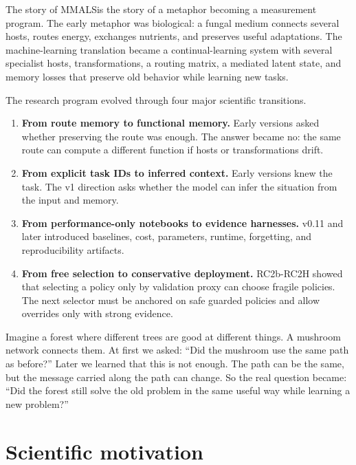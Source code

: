 \documentclass[11pt]{article}
\newcommand{\mmals}{\textsc{MMALS}}
\begin{document}
The story of \mmals is the story of a metaphor becoming a measurement program. The early metaphor was biological: a fungal medium connects several hosts, routes energy, exchanges nutrients, and preserves useful adaptations. The machine-learning translation became a continual-learning system with several specialist hosts, transformations, a routing matrix, a mediated latent state, and memory losses that preserve old behavior while learning new tasks.

The research program evolved through four major scientific transitions.

\begin{enumerate}[label=\textbf{T\arabic*.},leftmargin=*]
  \item \textbf{From route memory to functional memory.} Early versions asked whether preserving the route was enough. The answer became no: the same route can compute a different function if hosts or transformations drift.
  \item \textbf{From explicit task IDs to inferred context.} Early versions knew the task. The v1 direction asks whether the model can infer the situation from the input and memory.
  \item \textbf{From performance-only notebooks to evidence harnesses.} v0.11 and later introduced baselines, cost, parameters, runtime, forgetting, and reproducibility artifacts.
  \item \textbf{From free selection to conservative deployment.} RC2b-RC2H showed that selecting a policy only by validation proxy can choose fragile policies. The next selector must be anchored on safe guarded policies and allow overrides only with strong evidence.
\end{enumerate}

\begin{kidbox}
Imagine a forest where different trees are good at different things. A mushroom network connects them. At first we asked: ``Did the mushroom use the same path as before?'' Later we learned that this is not enough. The path can be the same, but the message carried along the path can change. So the real question became: ``Did the forest still solve the old problem in the same useful way while learning a new problem?''
\end{kidbox}

\section{Scientific motivation}
\end{document}
